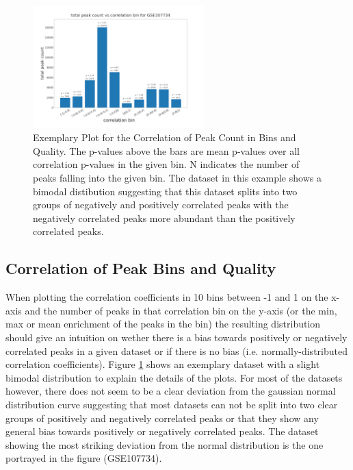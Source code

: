 \documentclass[5p]{elsarticle}
\begin{document}
\begin{figure}[t] %
	\centering
	
	\includegraphics[width=250px]{../figures/peak_quality_corr_example.png}
	
	\caption{Exemplary Plot for the Correlation of Peak Count in Bins and Quality. The p-values above the bars are mean p-values over all correlation p-values in the given bin. N indicates the number of peaks falling into the given bin. The dataset in this example shows a bimodal distibution suggesting that this dataset splits into two groups of negatively and positively correlated peaks with the negatively correlated peaks more abundant than the positively correlated peaks.}
	\label{figure2}
\end{figure}

\subsection{Correlation of Peak Bins and Quality}
When plotting the correlation coefficients in 10 bins between -1 and 1 on the x-axis and the number of peaks in that correlation bin on the y-axis (or the min, max or mean enrichment of the peaks in the bin) the resulting distribution should give an intuition on wether there is a bias towards positively or negatively correlated peaks in a given dataset or if there is no bias (i.e. normally-distributed correlation coefficients). Figure \ref{figure2} shows an exemplary dataset with a slight bimodal distribution to explain the details of the plots. For most of the datasets however, there does not seem to be a clear deviation from the gaussian normal distribution curve suggesting that most datasets can not be split into two clear groups of positively and negatively correlated peaks or that they show any general bias towards positively or negatively correlated peaks. The dataset showing the most striking deviation from the normal distribution is the one portrayed in the figure (GSE107734). 
\end{document}
